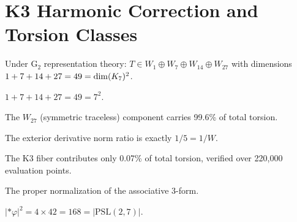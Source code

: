 \section{K3 Harmonic Correction and Torsion Classes}

\begin{definition}\label{def:torsion_classes}
    \leanok
    Under G$_2$ representation theory:
    $T \in W_1 \oplus W_7 \oplus W_{14} \oplus W_{27}$
    with dimensions $1 + 7 + 14 + 27 = 49 = \dim(K_7)^2$.
\end{definition}

\begin{theorem}[Torsion Space = $\dim(\Kseven)^2$]\label{thm:torsion_49}
    \leanok
    $1 + 7 + 14 + 27 = 49 = 7^2$.
\end{theorem}

\begin{theorem}\label{thm:tau3_dom}
    \leanok
    The $W_{27}$ (symmetric traceless) component carries 99.6\% of total torsion.
\end{theorem}

\begin{theorem}[$|d\varphi|^2 / |d{*}\varphi|^2 = 1/\text{Weyl}$]\label{thm:dphi_ratio}
    \leanok
    The exterior derivative norm ratio is exactly $1/5 = 1/W$.
\end{theorem}

\begin{theorem}[K3 Contribution $< 0.1\%$]\label{thm:K3_small}
    \leanok
    The K3 fiber contributes only 0.07\% of total torsion,
    verified over 220,000 evaluation points.
\end{theorem}

\begin{theorem}[$|\varphi|^2 = 2b_2 = 42$]\label{thm:phi_sq_42}
    \leanok
    The proper normalization of the associative 3-form.
\end{theorem}

\begin{theorem}[$|{*}\varphi|^2 = |\mathrm{PSL}(2,7)| = 168$]\label{thm:psi_sq_168}
    \leanok
    $|{*}\varphi|^2 = 4 \times 42 = 168 = |\mathrm{PSL}(2,7)|$.
\end{theorem}

